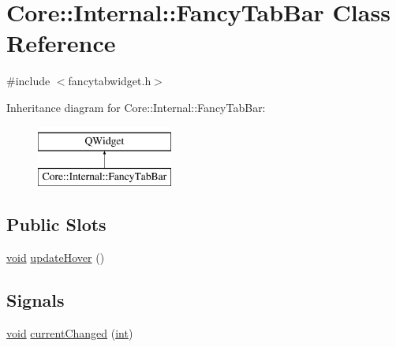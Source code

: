\hypertarget{class_core_1_1_internal_1_1_fancy_tab_bar}{\section{Core\-:\-:Internal\-:\-:Fancy\-Tab\-Bar Class Reference}
\label{class_core_1_1_internal_1_1_fancy_tab_bar}
}


{\ttfamily \#include $<$fancytabwidget.\-h$>$}

Inheritance diagram for Core\-:\-:Internal\-:\-:Fancy\-Tab\-Bar\-:\begin{figure}[H]
\begin{center}
\leavevmode
\includegraphics[height=2.000000cm]{class_core_1_1_internal_1_1_fancy_tab_bar}
\end{center}
\end{figure}
\subsection*{Public Slots}
\begin{DoxyCompactItemize}
\item 
\hyperlink{group___u_a_v_objects_plugin_ga444cf2ff3f0ecbe028adce838d373f5c}{void} \hyperlink{group___core_plugin_gaebba5e848c986c159a23e73619bb0fa8}{update\-Hover} ()
\end{DoxyCompactItemize}
\subsection*{Signals}
\begin{DoxyCompactItemize}
\item 
\hyperlink{group___u_a_v_objects_plugin_ga444cf2ff3f0ecbe028adce838d373f5c}{void} \hyperlink{group___core_plugin_ga15690cddfb9374c7357649e92af3e12b}{current\-Changed} (\hyperlink{ioapi_8h_a787fa3cf048117ba7123753c1e74fcd6}{int})
\end{DoxyCompactItemize}
